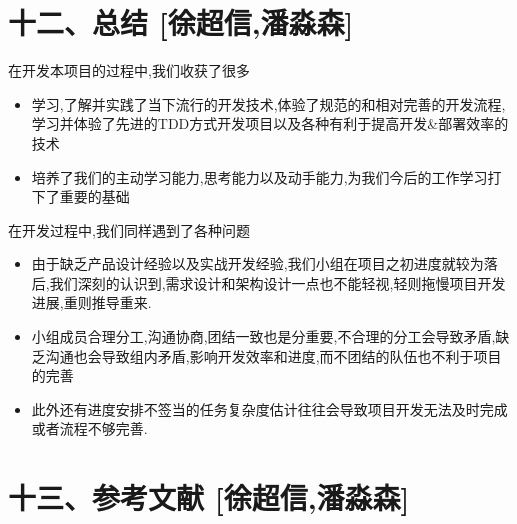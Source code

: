 \documentclass[
]{article}
\begin{document}
\hypertarget{ux5341ux4e8cux603bux7ed3-ux5f90ux8d85ux4fe1ux6f58ux6dfcux68ee}{%
\section{十二、总结
{[}徐超信,潘淼森{]}}\label{ux5341ux4e8cux603bux7ed3-ux5f90ux8d85ux4fe1ux6f58ux6dfcux68ee}}

在开发本项目的过程中,我们收获了很多

\begin{itemize}
\item
  学习,了解并实践了当下流行的开发技术,体验了规范的和相对完善的开发流程,学习并体验了先进的TDD方式开发项目以及各种有利于提高开发\&部署效率的技术
\item
  培养了我们的主动学习能力,思考能力以及动手能力,为我们今后的工作学习打下了重要的基础
\end{itemize}

在开发过程中,我们同样遇到了各种问题

\begin{itemize}
\item
  由于缺乏产品设计经验以及实战开发经验,我们小组在项目之初进度就较为落后,我们深刻的认识到,需求设计和架构设计一点也不能轻视,轻则拖慢项目开发进展,重则推导重来.
\item
  小组成员合理分工,沟通协商,团结一致也是分重要,不合理的分工会导致矛盾,缺乏沟通也会导致组内矛盾,影响开发效率和进度,而不团结的队伍也不利于项目的完善
\item
  此外还有进度安排不签当的任务复杂度估计往往会导致项目开发无法及时完成或者流程不够完善.
\end{itemize}

\hypertarget{ux5341ux4e09ux53c2ux8003ux6587ux732e-ux5f90ux8d85ux4fe1ux6f58ux6dfcux68ee}{%
\section{十三、参考文献
{[}徐超信,潘淼森{]}}\label{ux5341ux4e09ux53c2ux8003ux6587ux732e-ux5f90ux8d85ux4fe1ux6f58ux6dfcux68ee}}
\end{document}
